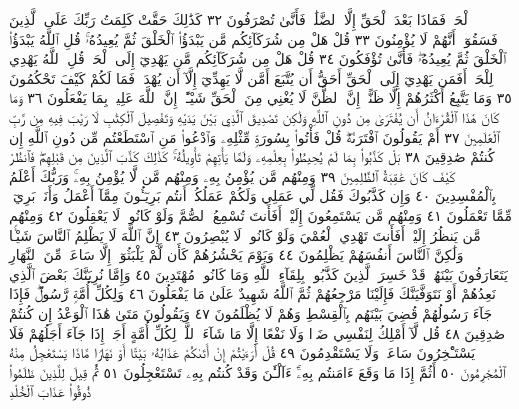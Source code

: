 ٱلْحَقُّۖ فَمَاذَا بَعْدَ ٱلْحَقِّ إِلَّا ٱلضَّلَٰلُۖ فَأَنَّىٰ تُصْرَفُونَ ٣٢ كَذَٰلِكَ
حَقَّتْ كَلِمَتُ رَبِّكَ عَلَى ٱلَّذِينَ فَسَقُوٓا۟ أَنَّهُمْ لَا يُؤْمِنُونَ ٣٣
قُلْ هَلْ مِن شُرَكَآئِكُم مَّن يَبْدَؤُا۟ ٱلْخَلْقَ ثُمَّ يُعِيدُهُۥۚ قُلِ ٱللَّهُ يَبْدَؤُا۟
ٱلْخَلْقَ ثُمَّ يُعِيدُهُۥۖ فَأَنَّىٰ تُؤْفَكُونَ ٣٤ قُلْ هَلْ مِن شُرَكَآئِكُم مَّن يَهْدِيٓ
إِلَى ٱلْحَقِّۚ قُلِ ٱللَّهُ يَهْدِي لِلْحَقِّۗ أَفَمَن يَهْدِيٓ إِلَى ٱلْحَقِّ أَحَقُّ أَن
يُتَّبَعَ أَمَّن لَّا يَهِدِّيٓ إِلَّآ أَن يُهْدَىٰۖ فَمَا لَكُمْ كَيْفَ تَحْكُمُونَ ٣٥
وَمَا يَتَّبِعُ أَكْثَرُهُمْ إِلَّا ظَنًّاۚ إِنَّ ٱلظَّنَّ لَا يُغْنِي مِنَ ٱلْحَقِّ شَيْـًٔاۚ
إِنَّ ٱللَّهَ عَلِيمُۢ بِمَا يَفْعَلُونَ ٣٦ وَمَا كَانَ هَٰذَا ٱلْقُرْءَانُ أَن يُفْتَرَىٰ
مِن دُونِ ٱللَّهِ وَلَٰكِن تَصْدِيقَ ٱلَّذِي بَيْنَ يَدَيْهِ وَتَفْصِيلَ ٱلْكِتَٰبِ
لَا رَيْبَ فِيهِ مِن رَّبِّ ٱلْعَٰلَمِينَ ٣٧ أَمْ يَقُولُونَ ٱفْتَرَىٰهُۖ قُلْ فَأْتُوا۟ بِسُورَةࣲ
مِّثْلِهِۦ وَٱدْعُوا۟ مَنِ ٱسْتَطَعْتُم مِّن دُونِ ٱللَّهِ إِن كُنتُمْ صَٰدِقِينَ ٣٨
بَلْ كَذَّبُوا۟ بِمَا لَمْ يُحِيطُوا۟ بِعِلْمِهِۦ وَلَمَّا يَأْتِهِمْ تَأْوِيلُهُۥۚ كَذَٰلِكَ
كَذَّبَ ٱلَّذِينَ مِن قَبْلِهِمْۖ فَٱنظُرْ كَيْفَ كَانَ عَٰقِبَةُ ٱلظَّٰلِمِينَ ٣٩
وَمِنْهُم مَّن يُؤْمِنُ بِهِۦ وَمِنْهُم مَّن لَّا يُؤْمِنُ بِهِۦۚ وَرَبُّكَ أَعْلَمُ
بِٱلْمُفْسِدِينَ ٤٠ وَإِن كَذَّبُوكَ فَقُل لِّي عَمَلِي وَلَكُمْ عَمَلُكُمْۖ أَنتُم
بَرِيٓـُٔونَ مِمَّآ أَعْمَلُ وَأَنَا۠ بَرِيٓءࣱ مِّمَّا تَعْمَلُونَ ٤١ وَمِنْهُم مَّن
يَسْتَمِعُونَ إِلَيْكَۚ أَفَأَنتَ تُسْمِعُ ٱلصُّمَّ وَلَوْ كَانُوا۟ لَا يَعْقِلُونَ ٤٢
وَمِنْهُم مَّن يَنظُرُ إِلَيْكَۚ أَفَأَنتَ تَهْدِي ٱلْعُمْيَ وَلَوْ كَانُوا۟ لَا يُبْصِرُونَ ٤٣
إِنَّ ٱللَّهَ لَا يَظْلِمُ ٱلنَّاسَ شَيْـࣰٔا وَلَٰكِنَّ ٱلنَّاسَ أَنفُسَهُمْ
يَظْلِمُونَ ٤٤ وَيَوْمَ يَحْشُرُهُمْ كَأَن لَّمْ يَلْبَثُوٓا۟ إِلَّا سَاعَةࣰ مِّنَ ٱلنَّهَارِ
يَتَعَارَفُونَ بَيْنَهُمْۚ قَدْ خَسِرَ ٱلَّذِينَ كَذَّبُوا۟ بِلِقَآءِ ٱللَّهِ وَمَا كَانُوا۟
مُهْتَدِينَ ٤٥ وَإِمَّا نُرِيَنَّكَ بَعْضَ ٱلَّذِي نَعِدُهُمْ أَوْ نَتَوَفَّيَنَّكَ
فَإِلَيْنَا مَرْجِعُهُمْ ثُمَّ ٱللَّهُ شَهِيدٌ عَلَىٰ مَا يَفْعَلُونَ ٤٦ وَلِكُلِّ
أُمَّةࣲ رَّسُولࣱۖ فَإِذَا جَآءَ رَسُولُهُمْ قُضِيَ بَيْنَهُم بِٱلْقِسْطِ وَهُمْ
لَا يُظْلَمُونَ ٤٧ وَيَقُولُونَ مَتَىٰ هَٰذَا ٱلْوَعْدُ إِن كُنتُمْ صَٰدِقِينَ ٤٨
قُل لَّآ أَمْلِكُ لِنَفْسِي ضَرࣰّا وَلَا نَفْعًا إِلَّا مَا شَآءَ ٱللَّهُۗ لِكُلِّ أُمَّةٍ
أَجَلٌۚ إِذَا جَآءَ أَجَلُهُمْ فَلَا يَسْتَـْٔخِرُونَ سَاعَةࣰ وَلَا يَسْتَقْدِمُونَ ٤٩
قُلْ أَرَءَيْتُمْ إِنْ أَتَىٰكُمْ عَذَابُهُۥ بَيَٰتًا أَوْ نَهَارࣰا مَّاذَا يَسْتَعْجِلُ مِنْهُ
ٱلْمُجْرِمُونَ ٥٠ أَثُمَّ إِذَا مَا وَقَعَ ءَامَنتُم بِهِۦٓۚ ءَآلْـَٰٔنَ وَقَدْ كُنتُم بِهِۦ
تَسْتَعْجِلُونَ ٥١ ثُمَّ قِيلَ لِلَّذِينَ ظَلَمُوا۟ ذُوقُوا۟ عَذَابَ ٱلْخُلْدِ
